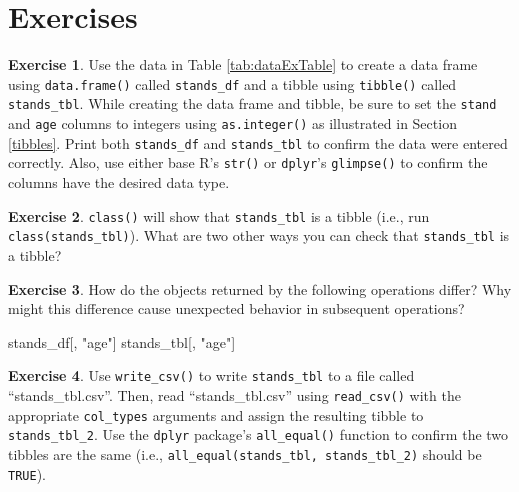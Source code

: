 \documentclass[
  11pt,
]{krantz}
\newenvironment{Shaded}{\begin{snugshade}}{\end{snugshade}}
\newcommand{\NormalTok}[1]{#1}
\newcommand{\StringTok}[1]{\textcolor[rgb]{0.31,0.60,0.02}{#1}}
\theoremstyle{definition}
\theoremstyle{definition}
\theoremstyle{definition}
\newtheorem{exercise}{Exercise}[chapter]
\theoremstyle{definition}
\theoremstyle{remark}
\begin{document}
\hypertarget{exercisesTidyverse}{%
\section{Exercises}\label{exercisesTidyverse}}

\begin{exercise}
\protect\hypertarget{exr:tidyverse1}{}\label{exr:tidyverse1}Use the data in Table \ref{tab:dataExTable} to create a data frame using \texttt{data.frame()} called \texttt{stands\_df} and a tibble using \texttt{tibble()} called \texttt{stands\_tbl}. While creating the data frame and tibble, be sure to set the \texttt{stand} and \texttt{age} columns to integers using \texttt{as.integer()} as illustrated in Section \ref{tibbles}. Print both \texttt{stands\_df} and \texttt{stands\_tbl} to confirm the data were entered correctly. Also, use either base R's \texttt{str()} or \texttt{dplyr}'s \texttt{glimpse()} to confirm the columns have the desired data type.
\end{exercise}

\begin{exercise}
\protect\hypertarget{exr:tidyverse2}{}\label{exr:tidyverse2}\texttt{class()} will show that \texttt{stands\_tbl} is a tibble (i.e., run \texttt{class(stands\_tbl)}). What are two other ways you can check that \texttt{stands\_tbl} is a tibble?
\end{exercise}

\begin{exercise}
\protect\hypertarget{exr:tidyverse3}{}\label{exr:tidyverse3}How do the objects returned by the following operations differ? Why might this difference cause unexpected behavior in subsequent operations?
\end{exercise}

\begin{Shaded}
\begin{Highlighting}[]
\NormalTok{stands\_df[, }\StringTok{"age"}\NormalTok{]}
\NormalTok{stands\_tbl[, }\StringTok{"age"}\NormalTok{]}
\end{Highlighting}
\end{Shaded}

\begin{exercise}
\protect\hypertarget{exr:tidyverse4}{}\label{exr:tidyverse4}Use \texttt{write\_csv()} to write \texttt{stands\_tbl} to a file called ``stands\_tbl.csv''. Then, read ``stands\_tbl.csv'' using \texttt{read\_csv()} with the appropriate \texttt{col\_types} arguments and assign the resulting tibble to \texttt{stands\_tbl\_2}. Use the \texttt{dplyr} package's \texttt{all\_equal()} function to confirm the two tibbles are the same (i.e., \texttt{all\_equal(stands\_tbl,\ stands\_tbl\_2)} should be \texttt{TRUE}).
\end{exercise}
\end{document}

